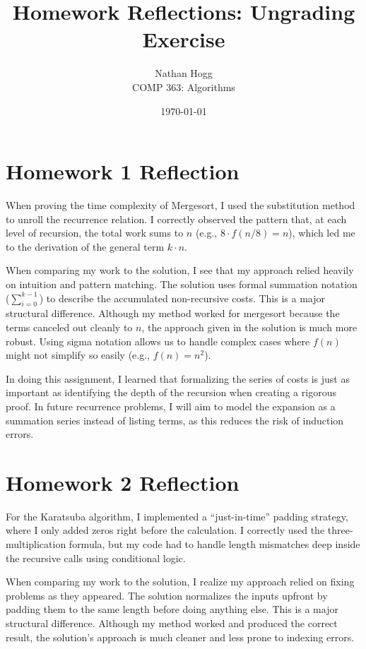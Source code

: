 \documentclass[11pt, letterpaper]{article}
\title{Homework Reflections: Ungrading Exercise}
\author{Nathan Hogg \\ COMP 363: Algorithms}
\date{\today}
\begin{document}
\maketitle

\section*{Homework 1 Reflection}

When proving the time complexity of Mergesort, I used the substitution method to unroll the recurrence relation. I correctly observed the pattern that, at each level of recursion, the total work sums to $n$ (e.g., $8 \cdot f(n/8) = n$), which led me to the derivation of the general term $k \cdot n$.

When comparing my work to the solution, I see that my approach relied heavily on intuition and pattern matching. The solution uses formal summation notation ($\sum_{i=0}^{k-1}$) to describe the accumulated non-recursive costs. This is a major structural difference. Although my method worked for mergesort because the terms canceled out cleanly to $n$, the approach given in the solution is much more robust. Using sigma notation allows us to handle complex cases where $f(n)$ might not simplify so easily (e.g., $f(n)=n^2$).

In doing this assignment, I learned that formalizing the series of costs is just as important as identifying the depth of the recursion when creating a rigorous proof. In future recurrence problems, I will aim to model the expansion as a summation series instead of listing terms, as this reduces the risk of induction errors.

\section*{Homework 2 Reflection}

For the Karatsuba algorithm, I implemented a ``just-in-time'' padding strategy, where I only added zeros right before the calculation. I correctly used the three-multiplication formula, but my code had to handle length mismatches deep inside the recursive calls using conditional logic.

When comparing my work to the solution, I realize my approach relied on fixing problems as they appeared. The solution normalizes the inputs upfront by padding them to the same length before doing anything else. This is a major structural difference. Although my method worked and produced the correct result, the solution's approach is much cleaner and less prone to indexing errors.
\end{document}
